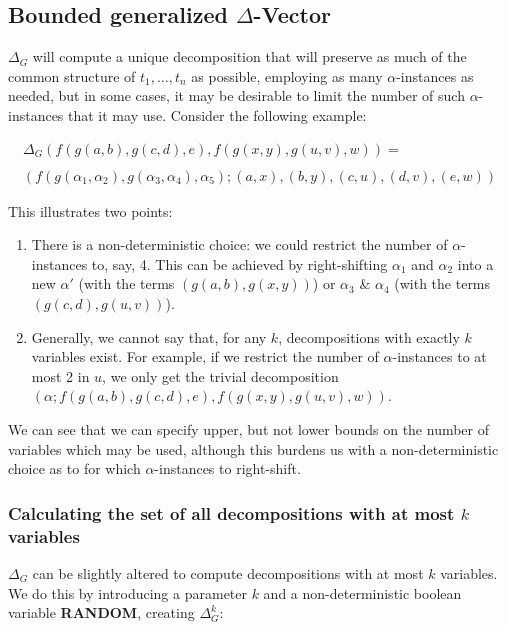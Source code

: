 \documentclass[a4paper, 11pt]{report}
\begin{document}
\subsection{Bounded generalized $\Delta$-Vector}

$\Delta_G$ will compute a unique decomposition that will preserve as much of the common structure of $t_1,\dots,t_n$ as possible, employing as many $\alpha$-instances as needed, but in some cases, it may be desirable to limit the number of such $\alpha$-instances that it may use.
Consider the following example:

$$
\begin{array}{l}
\Delta_G(f(g(a,b),g(c,d),e), f(g(x,y),g(u,v),w)) =\\
\\
(f(g(\alpha_1,\alpha_2),g(\alpha_3,\alpha_4),\alpha_5); (a,x), (b,y), (c,u), (d,v), (e,w))
\end{array}
$$

This illustrates two points:
\begin{enumerate}
\item There is a non-deterministic choice: we could restrict the number of $\alpha$-instances to, say, 4. This can be achieved by right-shifting $\alpha_1$ and $\alpha_2$ into a new $\alpha'$ (with the terms $(g(a,b),g(x,y))$) or $\alpha_3$ \& $\alpha_4$ (with the terms $(g(c,d),g(u,v))$).
\item Generally, we cannot say that, for any $k$, decompositions with exactly $k$ variables exist. For example, if we restrict the number of $\alpha$-instances to at most 2 in $u$, we only get the trivial decomposition $(\alpha; f(g(a,b),g(c,d),e), f(g(x,y),g(u,v),w))$.
\end{enumerate}

We can see that we can specify upper, but not lower bounds on the number of variables which may be used, although this burdens us with a non-deterministic choice as to for which $\alpha$-instances to right-shift.\\

\subsubsection{Calculating the set of all decompositions with at most $k$ variables}

$\Delta_G$ can be slightly altered to compute decompositions with at most $k$ variables. We do this by introducing a parameter $k$ and a non-deterministic boolean variable \textbf{RANDOM}, creating $\Delta_G^k$:
\end{document}
